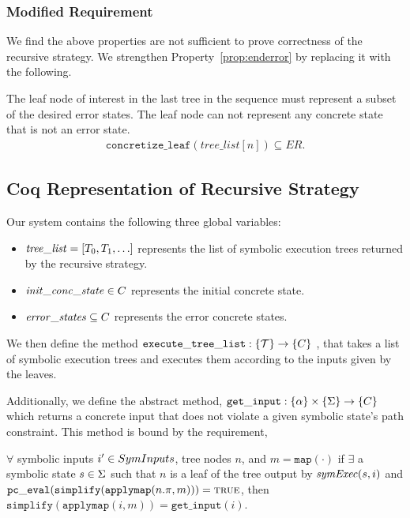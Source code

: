 \subsubsection{Modified Requirement}
We find the above properties are not sufficient to prove correctness of the
recursive strategy. We strengthen Property~\ref{prop:enderror} by replacing it with the following.

\setcounter{property}{1}
\renewcommand{\theproperty}{Z.\arabic{property}'} 
\begin{property}
  The leaf node of interest in the last tree in the
  sequence must represent a subset of the desired error states. The leaf node
  can not represent any concrete state that is not an error state.
  \label{prop:correctedz2}
  \begin{align*}
    \mathtt{concretize\_leaf}(\mathit{tree\_list}[n]) \subseteq \mathit{ER}.
  \end{align*}

 \end{property}
 
 
 \subsection{Coq Representation of Recursive Strategy}
Our system contains the following three global variables:
\begin{itemize}
\item $\mathit{tree\_list} = [T_0, T_1, \ldots]$ represents the list of symbolic execution trees returned by the recursive strategy.
\item $\mathit{init\_conc\_state} \in C$ represents the initial concrete state.
\item $\mathit{error\_states} \subseteq C$ represents the error concrete states.
\end{itemize}

We then define the method $ \mathtt{execute\_tree\_list} : \{ \mathcal{T} \} \rightarrow \{C\}$ , that takes a list of symbolic execution trees and executes them according to the inputs given by the leaves.

Additionally, we define the abstract method, $ \mathtt{get\_input} : \{\alpha\} \times \{\Sigma\} \rightarrow \{C\}$ which returns a concrete input that does not violate a given symbolic state's path constraint.
This method is bound by the requirement,

\begin{definition}
$ \forall$ symbolic inputs $i' \in SymInputs$, tree nodes $n$, and $m = \mathtt{map(\cdot)}$
if $\exists$ a symbolic state $s \in \Sigma$  such that
$n$ is a leaf of the tree output by $\mathit{symExec}(s, i)$ and 
$\mathtt{pc\_eval} (\mathtt{simplify}(\mathtt{applymap} (n.\pi, m))) = \mathtt{\textsc{true}}$, then
$\mathtt{simplify}(\mathtt{applymap} (i, m)) = \mathtt{get\_input}(i)$.
\end{definition}



